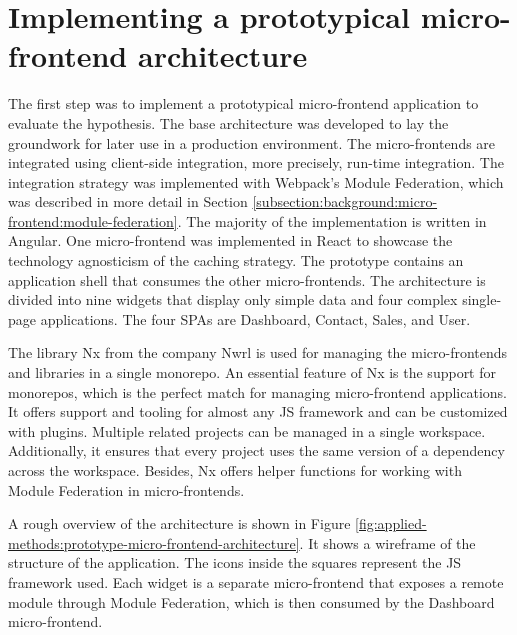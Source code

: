 \section{Implementing a prototypical micro-frontend architecture}\label{section:applied-methods:prototypical-implementation}

The first step was to implement a prototypical micro-frontend application to evaluate the hypothesis. The base architecture was developed to lay the groundwork for later use in a production environment. The micro-frontends are integrated using client-side integration, more precisely, run-time integration. The integration strategy was implemented with Webpack's Module Federation, which was described in more detail in Section \ref{subsection:background:micro-frontend:module-federation}. The majority of the implementation is written in Angular. One micro-frontend was implemented in React to showcase the technology agnosticism of the caching strategy. The prototype contains an application shell that consumes the other micro-frontends. The architecture is divided into nine widgets that display only simple data and four complex single-page applications. The four \acp{SPA} are Dashboard, Contact, Sales, and User.

\bigskip

\noindent The library Nx from the company Nwrl is used for managing the micro-frontends and libraries in a single monorepo. An essential feature of Nx is the support for monorepos, which is the perfect match for managing micro-frontend applications. It offers support and tooling for almost any \ac{JS} framework and can be customized with plugins. Multiple related projects can be managed in a single workspace. Additionally, it ensures that every project uses the same version of a dependency across the workspace. Besides, Nx offers helper functions for working with Module Federation in micro-frontends. \cite{misc:-:applied-methods:intro-to-nx}

\bigskip

\noindent A rough overview of the architecture is shown in Figure \ref{fig:applied-methods:prototype-micro-frontend-architecture}. It shows a wireframe of the structure of the application. The icons inside the squares represent the \ac{JS} framework used. Each widget is a separate micro-frontend that exposes a remote module through Module Federation, which is then consumed by the Dashboard micro-frontend.

